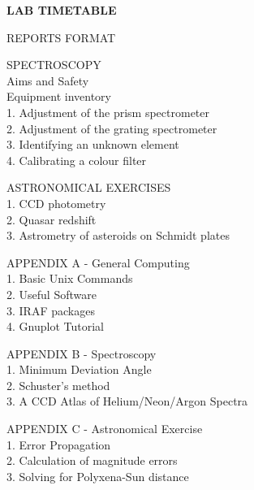 \documentclass[12pt]{article}
\begin{document}
{\bf
LAB TIMETABLE

REPORTS FORMAT

SPECTROSCOPY \\
\hspace*{2cm} Aims and Safety \\
\hspace*{2cm} Equipment inventory\\
\hspace*{2cm}1. Adjustment of the prism spectrometer\\
\hspace*{2cm}2. Adjustment of the grating spectrometer\\
\hspace*{2cm}3. Identifying an unknown element\\
\hspace*{2cm}4. Calibrating a colour filter

ASTRONOMICAL EXERCISES \\
\hspace*{2cm}1. CCD photometry\\
\hspace*{2cm}2. Quasar redshift \\
\hspace*{2cm}3. Astrometry of asteroids on Schmidt plates

APPENDIX A - General Computing\\
\hspace*{2cm}1. Basic Unix Commands\\
\hspace*{2cm}2. Useful Software\\
\hspace*{2cm}3. IRAF packages\\
\hspace*{2cm}4. Gnuplot Tutorial

APPENDIX B - Spectroscopy\\
\hspace*{2cm}1. Minimum Deviation Angle\\
\hspace*{2cm}2. Schuster's method\\
\hspace*{2cm}3. A CCD Atlas of Helium/Neon/Argon Spectra

APPENDIX C - Astronomical Exercise\\
\hspace*{2cm}1. Error Propagation\\
\hspace*{2cm}2. Calculation of magnitude errors\\
\hspace*{2cm}3. Solving for Polyxena-Sun distance


}
\end{document}

